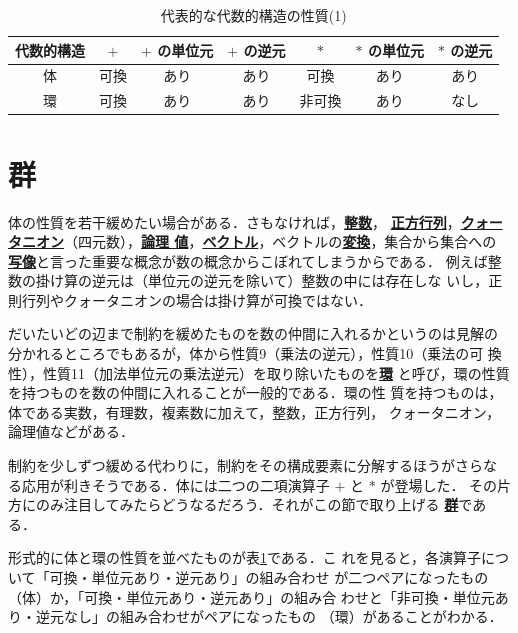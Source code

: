 \documentclass[a5paper,twoside,fleqn]{jsbook}
\newcommand{\keyword}[1]{{\underline{\textbf{#1}}}}
\begin{document}
\begin{table}
\caption{代表的な代数的構造の性質(1)}
\label{tab:field-and-ring}
\begin{center}
\begin{tabular}{||c||c|c|c|c|c|c||}
\hline
代数的構造&$+$&$+$ の単位元&$+$ の逆元&$*$&$*$ の単位元&$*$ の逆元\\
\hline\hline
体&可換&あり&あり&可換&あり&あり\\
環&可換&あり&あり&非可換&あり&なし\\
\hline
\end{tabular}
\end{center}
\end{table}

\section{群}

体の性質を若干緩めたい場合がある．さもなければ，\keyword{整数}，
\keyword{正方行列}，\keyword{クォータニオン}（四元数），\keyword{論理
値}，\keyword{ベクトル}，ベクトルの\keyword{変換}，集合から集合への
\keyword{写像}と言った重要な概念が数の概念からこぼれてしまうからである．
例えば整数の掛け算の逆元は（単位元の逆元を除いて）整数の中には存在しな
いし，正則行列やクォータニオンの場合は掛け算が可換ではない．

だいたいどの辺まで制約を緩めたものを数の仲間に入れるかというのは見解の
分かれるところでもあるが，体から性質9（乗法の逆元），性質10（乗法の可
換性），性質11（加法単位元の乗法逆元）を取り除いたものを\keyword{環}
と呼び，環の性質を持つものを数の仲間に入れることが一般的である．環の性
質を持つものは，体である実数，有理数，複素数に加えて，整数，正方行列，
クォータニオン，論理値などがある．

制約を少しずつ緩める代わりに，制約をその構成要素に分解するほうがさらな
る応用が利きそうである．体には二つの二項演算子 $+$ と $*$ が登場した．
その片方にのみ注目してみたらどうなるだろう．それがこの節で取り上げる
\keyword{群}である．

形式的に体と環の性質を並べたものが表\ref{tab:field-and-ring}である．こ
れを見ると，各演算子について「可換・単位元あり・逆元あり」の組み合わせ
が二つペアになったもの（体）か，「可換・単位元あり・逆元あり」の組み合
わせと「非可換・単位元あり・逆元なし」の組み合わせがペアになったもの
（環）があることがわかる．
\end{document}
